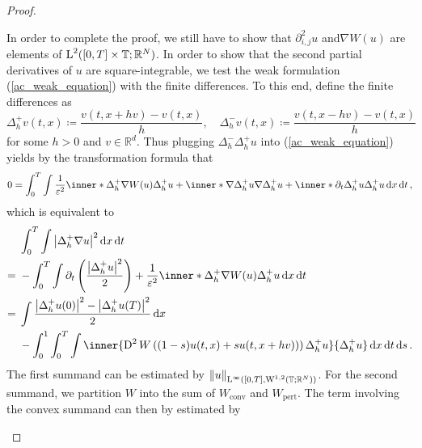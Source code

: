\begin{proof}
\begin{description}[wide=0pt]
	In order to complete the proof, we still have to show that $ \partial_{ i , j }^{ 2 } u$ and$ \nabla W ( u) $ are elements of $ \operatorname{L}^{ 2 } ( [ 0 , T ] \times \operatorname{\mathbb{T}} ; \mathbb{ R }^{ N } ) $.
	In order to show that the second partial derivatives of $ u $ are square-integrable, we test the weak formulation (\ref{ac_weak_equation}) with the finite differences. To this end, define the finite differences as
	\begin{equation*}
		\Delta_{ h }^{ + } v ( t , x ) \coloneqq \frac{ v ( t , x + h v ) - v ( t , x ) }{ h },
		\quad
		\Delta_{ h }^{ - } v ( t , x ) \coloneqq \frac{ v ( t , x - h v ) - v ( t , x ) }{ h }
	\end{equation*}
	for some $ h > 0 $ and $ v \in \mathbb{ R }^{ d } $. Thus plugging $ \Delta_{ h }^{ - } \Delta_{ h }^{ + } u $ into (\ref{ac_weak_equation}) yields by the transformation formula that
	\begin{equation*}
		0
		=
		\int_{ 0 }^{ T }
			\int
				\frac{ 1 }{ \varepsilon^{ 2 } }
				\inner*{ \Delta_{ h }^{ + } \nabla W ( u ) }{ \Delta_{ h }^{ + } u }
				+
				\inner*{ \nabla \Delta_{ h }^{ + } u }{ \nabla \Delta_{ h }^{ + } u }
				+
				\inner*{ \partial_{ t } \Delta_{ h }^{ + } u }{ \Delta_{ h }^{ + } u }
			\dd{ x }
		\dd{ t },
	\end{equation*}
	which is equivalent to
	\begin{align*}
		& \int_{ 0 }^{ T }
			\int
				\abs{ \Delta_{ h }^{ + } \nabla u }^{ 2 }
			\dd{ x }
		\dd{ t }
		\\
		={} &
		-
		\int_{ 0 }^{ T }
			\int
				\partial_{ t } \left( \frac{ \abs{ \Delta_{ h }^{ + } u }^{ 2 } }{ 2 } \right)
				+
				\frac{ 1 }{ \varepsilon^{ 2 } }
				\inner*{ \Delta_{ h }^{ + } \nabla W ( u ) }{ \Delta_{ h }^{ + } u }
			\dd{ x }
		\dd{ t }
		\\
		={} &
		\int  
			\frac{ \abs{ \Delta_{ h }^{ + } u ( 0 ) }^{ 2 } - \abs{ \Delta_{ h }^{ + } u ( T ) }^{ 2 } }{ 2 }
		\dd{ x }
		\\
		& -
		\int_{ 0 }^{ 1 }
			\int_{ 0 }^{ T }
				\int
					\inner{ 
						\diff^{ 2 } W \left( ( 1 - s ) u ( t, x  ) + s u( t,  x + h v ) ) \right) 
						\Delta_{ h }^{ + } u
					}{
					\Delta_{ h }^{ + } u 
					}
				\dd{ x }
			\dd{ t }
		\dd{ s }.
	\end{align*}
	The first summand can be estimated by $ \norm{ u }_{ \operatorname{L}^{ \infty } ( [0 , T ] , \operatorname{W}^{ 1 , 2 } ( \operatorname{\mathbb{T}} ; \mathbb{ R }^{ N } ) ) } $. For the second summand, we partition $ W $ into the sum of $ W_{ \mathrm{conv} } $ and $ W_{ \mathrm{pert} } $. The term involving the convex summand can then by estimated by

\end{description}
\end{proof}
